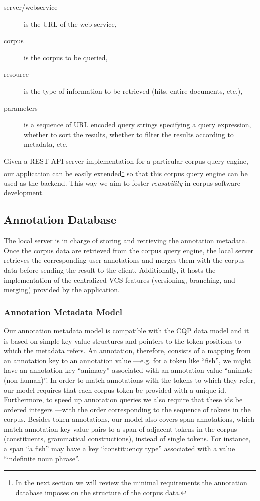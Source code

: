 \documentclass{sig-alternate}
\begin{document}
\begin{description}
\item [server/webservice] is the URL of the web service,
\item [corpus] is the corpus to be queried,
\item [resource] is the type of information to be retrieved (hits, entire documents, etc.),
\item [parameters] is a sequence of URL encoded query strings specifying a query expression,
  whether to sort the results, whether to filter the results according to metadata, etc.
\end{description}

Given a REST API server implementation for a particular corpus query engine, our application can
be easily extended\footnote{
  In the next section we will review the minimal requirements the annotation database imposes on
the structure of the corpus data.
} so that this corpus query engine can be used as the backend. This way we aim to foster
\textit{reusability} in corpus software development.

\subsection{Annotation Database}\label{subsec:db}
The local server is in charge of storing and retrieving the annotation metadata. Once the corpus data
are retrieved from the corpus query engine, the local server retrieves the corresponding user
annotations and merges them with the corpus data before sending the result to the client.
Additionally, it hosts the implementation of the centralized%
VCS features (versioning, branching, and merging) provided by the application.

\subsubsection{Annotation Metadata Model}\label{subsec:datamodel}

Our annotation metadata model is compatible with the CQP data model \cite{Christ1999} and
it is based on simple key-value structures and pointers to the token
positions to which the metadata refers. An annotation, therefore, consists of a mapping from
an annotation key to an annotation value ---e.g. for a token like ``fish'', we might
have an annotation key ``animacy'' associated with an annotation value ``animate (non-human)''.
In order to match annotations with the tokens to which they refer, our model requires that
each corpus token be provided with a unique id.
Furthermore, to speed up annotation queries we also require that these ids be ordered integers
---with the order corresponding to the sequence of tokens in the corpus.
Besides token annotations, our model also covers span annotations, which match annotation
key-value pairs to a span of adjacent tokens in the corpus (constituents, grammatical constructions),
instead of single tokens. For instance, a span ``a fish'' may have a key ``constituency type''
associated with a value ``indefinite noun phrase''.
\end{document}
